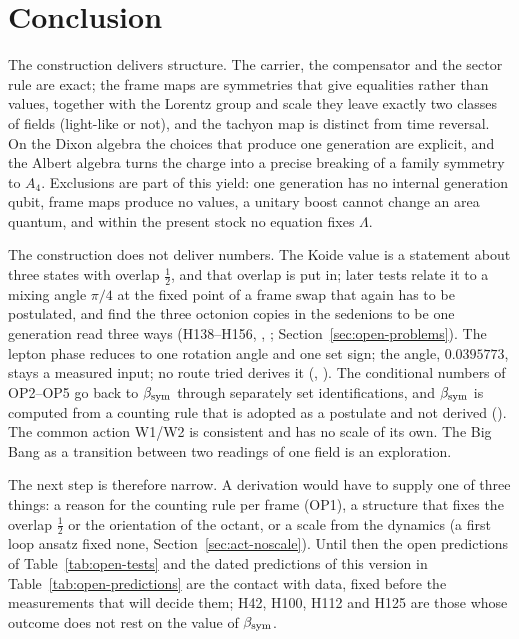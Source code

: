 \section{Conclusion}
\label{sec:concl}

The construction delivers structure. The carrier, the compensator and the sector rule are exact; the frame maps are symmetries
that give equalities rather than values, together with the Lorentz group and scale they leave exactly two classes of fields
(light-like or not), and the tachyon map is distinct from time reversal. On the Dixon algebra the
choices that produce one generation are explicit, and the Albert algebra turns the charge into a precise breaking of a family
symmetry to $A_4$. Exclusions are part of this yield: one generation has no internal generation qubit, frame maps produce no
values, a unitary boost cannot change an area quantum, and within the present stock no equation fixes $\Lambda$.

The construction does not deliver numbers. The Koide value is a statement about three states with overlap $\tfrac12$, and that
overlap is put in; later tests relate it to a mixing angle $\pi/4$ at the fixed point of a frame swap that again has to be
postulated, and find the three octonion copies in the sedenions to be one generation read three ways (H138--H156, , ;
Section~\ref{sec:open-problems}). The lepton phase reduces to one rotation angle and one set sign; the angle, $0.0395773$, stays a measured
input; no route tried derives it (, ). The conditional numbers of OP2--OP5 go back to $\beta_{\mathrm{sym}}$
through separately set identifications, and $\beta_{\mathrm{sym}}$ is computed from a counting rule that is adopted as a postulate and not derived (). The
common action W1/W2 is consistent and has no scale of its own. The Big Bang as a transition between two readings of one field is
an exploration.

The next step is therefore narrow. A derivation would have to supply one of three things: a reason for the counting rule per frame
(OP1), a structure that fixes the overlap $\tfrac12$ or the orientation of the octant, or a scale from the dynamics (a first
loop ansatz fixed none, Section~\ref{sec:act-noscale}). Until then the
open predictions of Table~\ref{tab:open-tests} and the dated predictions of this version in Table~\ref{tab:open-predictions} are the contact
with data, fixed before the measurements that will decide them; H42, H100, H112 and H125 are those whose outcome does not
rest on the value of $\beta_{\mathrm{sym}}$.
